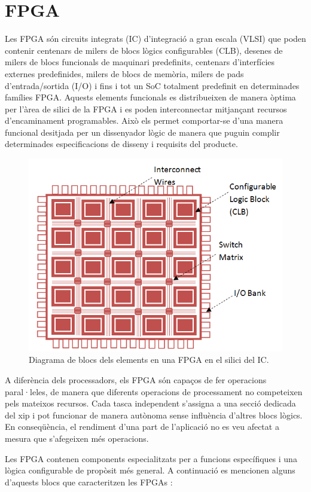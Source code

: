 \section{FPGA}
\par Les FPGA són circuits integrats (IC) d'integració a gran escala (VLSI) que poden contenir centenars de milers de blocs lògics configurables (CLB), desenes de milers de blocs funcionals de maquinari predefinits, centenars d'interfícies externes predefinides, milers de blocs de memòria, milers de pads d'entrada/sortida (I/O) i fins i tot un SoC totalment predefinit en determinades famílies FPGA. Aquests elements funcionals es distribueixen de manera òptima per l'àrea de silici de la FPGA i es poden interconnectar mitjançant recursos d'encaminament programables. Això els permet comportar-se d'una manera funcional desitjada per un dissenyador lògic de manera que puguin complir determinades especificacions de disseny i requisits del producte. \cite{Maaref2023} 
\begin{figure}[H]
    \centering
    \includegraphics[width=0.5\linewidth]{Images/FPGAdiagram.png}
    \caption{Diagrama de blocs dels elements en una FPGA en el silici del IC.}
    \label{figFPGA}
\end{figure}
\par A diferència dels processadors, els FPGA són capaços de fer operacions paral·leles, de manera que diferents operacions de processament no competeixen pels mateixos recursos. Cada tasca independent s'assigna a una secció dedicada del xip i pot funcionar de manera autònoma sense influència d'altres blocs lògics. En conseqüència, el rendiment d'una part de l'aplicació no es veu afectat a mesura que s'afegeixen més operacions.
\par Les FPGA contenen components especialitzats per a funcions específiques i una lògica configurable de propòsit més general. A continuació es mencionen alguns d'aquests blocs que caracteritzen les FPGAs \cite{FPGADig}:
